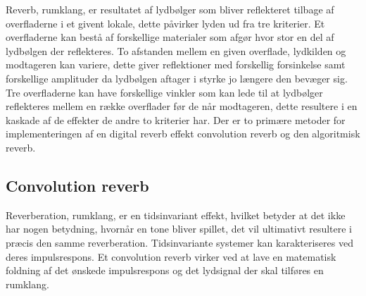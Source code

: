 Reverb, rumklang, er resultatet af lydbølger som bliver reflekteret tilbage af %
overfladerne i et givent lokale, dette påvirker lyden ud fra tre kriterier.\newline 
Et overfladerne kan bestå af forskellige materialer som afgør hvor stor en del af lydbølgen der reflekteres.\newline 
To afstanden mellem en given overflade, lydkilden og modtageren kan variere, dette giver reflektioner med forskellig forsinkelse samt forskellige amplituder da lydbølgen aftager i styrke jo længere den bevæger sig.\newline 
Tre overfladerne kan have forskellige vinkler som kan lede til at lydbølger reflekteres mellem en række overflader før de når modtageren, dette resultere i en kaskade af de effekter de andre to kriterier har.\newline
Der er to primære metoder for implementeringen af en digital reverb effekt convolution reverb og den algoritmisk reverb.
\subsection{Convolution reverb}
Reverberation, rumklang, er en tidsinvariant effekt, hvilket betyder at det ikke har nogen betydning, hvornår en tone bliver spillet, det vil ultimativt resultere i præcis den samme reverberation. \newline
Tidsinvariante systemer kan karakteriseres ved deres impulsrespons.
Et convolution reverb virker ved at lave en matematisk foldning af det ønskede %
impulsrespons og det lydsignal der skal tilføres en rumklang.\newline 

